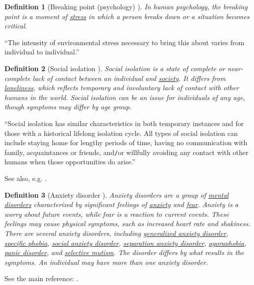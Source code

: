 \documentclass[12pt]{article}
\numberwithin{equation}{section}
\newtheorem{definition}{Definition}[section]
\begin{document}
\begin{definition}[Breaking point (psychology) \cite{Wikepedia/Breaking point (psychology)}]
    In human psychology, the \emph{breaking point} is a moment of \href{https://en.wikipedia.org/wiki/Stress_(medicine)}{stress} in which a person breaks down or a situation becomes critical.
\end{definition}
``The intensity of environmental stress necessary to bring this about varies from individual to individual.''

\begin{definition}[Social isolation \cite{Wikipedia/Social isolation}]
    \emph{Social isolation} is a state of complete or near-complete lack of contact between an individual and \href{https://en.wikipedia.org/wiki/Society}{society}. It differs from \href{https://en.wikipedia.org/wiki/Loneliness}{loneliness}, which reflects temporary and involuntary lack of contact with other humans in the world. Social isolation can be an issue for individuals of any age, though symptoms may differ by age group.
\end{definition}
``Social isolation has similar characteristics in both temporary instances and for those with a historical lifelong isolation cycle. All types of social isolation can include staying home for lengthy periods of time, having no communication with family, acquaintances or friends, and\texttt{/}or willfully avoiding any contact with other humans when those opportunities do arise.''

See also, e.g. \cite{NASEM2020,NhuTrang2020}.

\begin{definition}[Anxiety disorder \cite{Wikipedia/Anxiety disorder}]
    \emph{Anxiety disorders} are a group of \href{https://en.wikipedia.org/wiki/Mental_disorder}{mental disorders} characterized by significant feelings of \href{https://en.wikipedia.org/wiki/Anxiety_(mood)}{anxiety} and \href{https://en.wikipedia.org/wiki/Fear}{fear}. Anxiety is a worry about future events, while fear is a reaction to current events. These feelings may cause physical symptoms, such as increased heart rate and shakiness. There are several anxiety disorders, including \href{https://en.wikipedia.org/wiki/Generalized_anxiety_disorder}{generalized anxiety disorder}, \href{https://en.wikipedia.org/wiki/Specific_phobia}{specific phobia}, \href{https://en.wikipedia.org/wiki/Social_anxiety_disorder}{social anxiety disorder}, \href{https://en.wikipedia.org/wiki/Separation_anxiety_disorder}{separation anxiety disorder}, \href{https://en.wikipedia.org/wiki/Agoraphobia}{agoraphobia}, \href{https://en.wikipedia.org/wiki/Panic_disorder}{panic disorder}, and \href{https://en.wikipedia.org/wiki/Selective_mutism}{selective mutism}. The disorder differs by what results in the symptoms. An individual may have more than one anxiety disorder.
\end{definition}
See the main reference: \cite{APA2013}.
\end{document}
